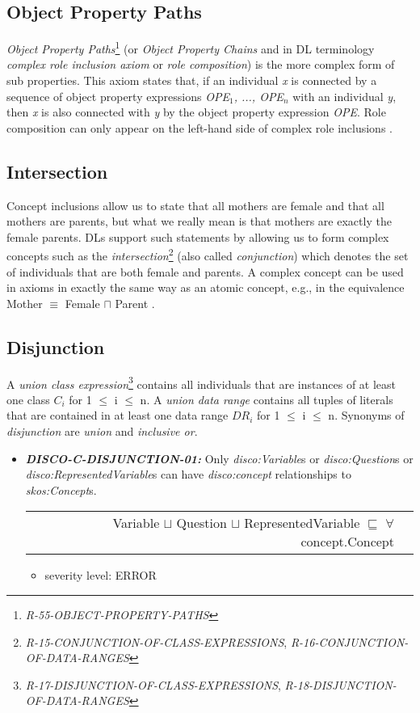 \documentclass{llncs}
\newenvironment{DL}{
  \vspace{0cm}
  \begin{tabular}{r l}

}{
  \end{tabular}
}
\begin{document}
\subsection{Object Property Paths}

\emph{Object Property Paths}\footnote{\emph{R-55-OBJECT-PROPERTY-PATHS}} (or \emph{Object Property Chains} and in DL terminology \emph{complex role inclusion axiom} or \emph{role composition}) is the more complex form of sub properties. 
This axiom states that, if an individual \emph{x} is connected by a sequence of object property expressions \emph{OPE$_1$, ..., OPE$_n$} with an individual \emph{y}, then \emph{x} is also connected with \emph{y} by the object property expression \emph{OPE}.  
Role composition can only appear on the left-hand side of complex role inclusions \cite{Kroetzsch2012}.

\subsection{Intersection}

Concept inclusions allow us to state that all mothers are female and that
all mothers are parents, but what we really mean is that mothers are exactly the female
parents. DLs support such statements by allowing us to form complex concepts such as
the \emph{intersection}\footnote{\emph{R-15-CONJUNCTION-OF-CLASS-EXPRESSIONS}, \emph{R-16-CONJUNCTION-OF-DATA-RANGES}} (also called \emph{conjunction})
which denotes the set of individuals that are both female and parents. A complex concept
can be used in axioms in exactly the same way as an atomic concept, e.g., in the
equivalence Mother $\equiv$ Female $\sqcap$ Parent .

\subsection{Disjunction}

A \emph{union class expression}\footnote{{\em R-17-DISJUNCTION-OF-CLASS-EXPRESSIONS}, {\em R-18-DISJUNCTION-OF-DATA-RANGES}} contains all individuals that are instances of at least one class $C_{i}$ for 1 $\leq$ i $\leq$ n. 
A \emph{union data range} contains all tuples of literals that are contained in at least one data range $DR_{i}$ for 1 $\leq$ i $\leq$ n.
Synonyms of {\em disjunction} are {\em union} and {\em inclusive or}.

\begin{itemize}
	\item \textbf{{\em DISCO-C-DISJUNCTION-01:}} 
Only {\em disco:Variable}s or {\em disco:Question}s or {\em disco:RepresentedVariable}s can have {\em disco:concept} relationships to {\em skos:Concept}s.

\begin{DL}
Variable $\sqcup$ Question $\sqcup$ RepresentedVariable $\sqsubseteq$ $\forall$ concept.Concept \\
\end{DL}
\begin{itemize}
	\item severity level: ERROR
\end{itemize}
\end{itemize}
\end{document}
